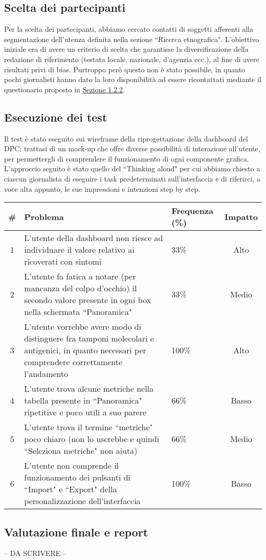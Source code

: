 \subsection{Scelta dei partecipanti}
\label{ss:scelta-partecipanti}
Per la scelta dei partecipanti, abbiamo cercato contatti di soggetti afferenti alla segmentazione dell'utenza definita nella sezione ``Ricerca etnografica". L'obiettivo iniziale era di avere un criterio di scelta che garantisse la diversificazione della redazione di riferimento (testata locale, nazionale, d'agenzia ecc.), al fine di avere risultati privi di bias.
Purtroppo però questo non è stato possibile, in quanto pochi giornalisti hanno dato la loro disponibilità ad essere ricontattati mediante il questionario proposto in \hyperref[ss:questionario-online]{Sezione 1.2.2}.

\subsection{Esecuzione dei test}
\label{ss:esecuzione-test}
Il test è stato eseguito sui wireframe della riprogettazione della dashboard del DPC: trattasi di un mock-up che offre diverse possibilità di interazione all'utente, per permettergli di comprendere il funzionamento di ogni componente grafica.\\
L'approccio seguito è stato quello del ``Thinking aloud" per cui abbiamo chiesto a ciascun giornalista di eseguire i task predeterminati sull'interfaccia e di riferirci, a voce alta appunto, le sue impressioni e intenzioni step by step.\\

{
\renewcommand{\arraystretch}{2}
\begin{longtable}{|c|p{9cm}|p{3cm}|c|}
    \hline
    \textbf{\#} & \textbf{Problema} & \textbf{Frequenza (\%)} & \textbf{Impatto} \\
    \hline
    \endhead
    1 & L'utente della dashboard non riesce ad individuare il valore relativo ai ricoverati con sintomi & 33\% & Alto \\ \hline
    2 & L'utente fa fatica a notare (per mancanza del colpo d'occhio) il secondo valore presente in ogni box nella schermata ``Panoramica" & 33\% & Medio \\ \hline
    3 & L'utente vorrebbe avere modo di distinguere fra tamponi molecolari e antigenici, in quanto necessari per comprendere correttamente l'andamento & 100\% & Alto \\ \hline
    4 & L'utente trova alcune metriche nella tabella presente in ``Panoramica" ripetitive e poco utili a suo parere & 66\% & Basso \\ \hline
    5 & L'utente trova il termine ``metriche" poco chiaro (non lo userebbe e quindi ``Seleziona metriche" non aiuta) & 66\% & Medio \\ \hline
    6 & L'utente non comprende il funzionamento dei pulsanti di ``Import" e ``Export" della personalizzazione dell'interfaccia & 100\% & Basso \\ \hline
\end{longtable}
}

\subsection{Valutazione finale e report}
\label{ss:valutazione-finale-report}

-- DA SCRIVERE --